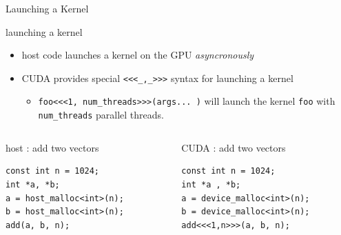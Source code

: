 \documentclass[aspectratio=43]{beamer}
\newcommand{\lst}[1]{\colorbox{white!90!blue}{\lstinline!#1!}}
\begin{document}
\begin{frame}[fragile]{Launching a Kernel}
    \begin{info}{launching a kernel}
    \begin{itemize}
        \item host code launches a kernel on the GPU \emph{asyncronously}
        \item CUDA provides special \lst{<<<_,_>>>} syntax for launching a kernel
        \begin{itemize}
            \item \lst{foo<<<1, num_threads>>>(args... )} will launch the kernel \lst{foo} with \lst{num_threads} parallel threads.
        \end{itemize}
    \end{itemize}
    \end{info}

    \begin{columns}[T]
        \begin{column}{0.5\textwidth}
            \begin{code}{host : add two vectors}
        \begin{lstlisting}[style=boxcuda]
const int n = 1024;
int *a, *b;
a = host_malloc<int>(n);
b = host_malloc<int>(n);
add(a, b, n);
        \end{lstlisting}
            \end{code}
        \end{column} \begin{column}{0.5\textwidth}
            \begin{code}{CUDA : add two vectors}
        \begin{lstlisting}[style=boxcuda]
const int n = 1024;
int *a , *b;
a = device_malloc<int>(n);
b = device_malloc<int>(n);
add<<<1,n>>>(a, b, n);
        \end{lstlisting}
            \end{code}
        \end{column}
    \end{columns}

\end{frame}
\end{document}
